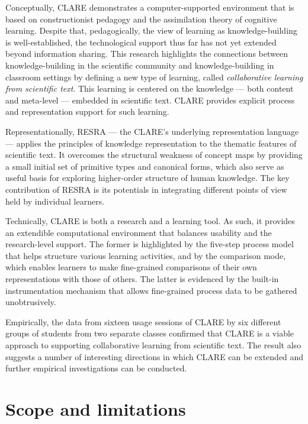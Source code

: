 Conceptually, CLARE demonstrates a computer-supported environment that is
based on constructionist pedagogy and the assimilation theory of cognitive
learning. Despite that, pedagogically, the view of learning as
knowledge-building is well-established, the technological support thus far
has not yet extended beyond information sharing. This research highlights
the connections between knowledge-building in the scientific community and
knowledge-building in classroom settings by defining a new type of
learning, called {\it collaborative learning from scientific text\/}. This
learning is centered on the knowledge --- both content and meta-level --- 
embedded in scientific text. CLARE provides explicit process and
representation support for such learning.

Representationally, RESRA --- the CLARE's underlying representation
language --- applies the principles of knowledge representation to the
thematic features of scientific text. It overcomes the structural weakness
of concept maps by providing a small initial set of primitive types and
canonical forms, which also serve as useful basis for exploring
higher-order structure of human knowledge. The key contribution of RESRA is
its potentials in integrating different points of view held by individual
learners.

Technically, CLARE is both a research and a learning tool. As such, it
provides an extendible computational environment that balances usability
and the research-level support. The former is highlighted by the five-step
process model that helps structure various learning activities, and by the
comparison mode, which enables learners to make fine-grained comparisons of
their own representations with those of others. The latter is evidenced by
the built-in instrumentation mechanism that allows fine-grained process
data to be gathered unobtrusively.

Empirically, the data from sixteen usage sessions of CLARE by six different
groups of students from two separate classes confirmed that CLARE is a
viable approach to supporting collaborative learning from scientific text.
The result also suggests a number of interesting directions in which CLARE
can be extended and further empirical investigations can be conducted.


\section{Scope and limitations}
\label{sec:limitations}

